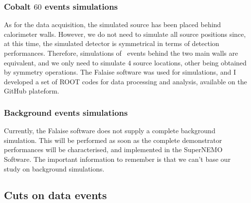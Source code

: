 \subsubsection*{Cobalt $60$ events simulations}
As for the data acquisition, the simulated source has been placed behind calorimeter walls.
However, we do not need to simulate all source positions since, at this time, the simulated detector is symmetrical in terms of detection performances.
Therefore, simulations of \Co\ events behind the two main walls are equivalent, and we only need to simulate $4$ source locations, other being obtained by symmetry operations.
The Falaise software was used for simulations, and I developed a set of ROOT codes for data processing and analysis, available on the GitHub plateform.


\subsubsection*{Background events simulations}

Currently, the Falaise software does not supply a complete background simulation.
This will be performed as soon as the complete demonstrator performances will be characterised, and implemented in the SuperNEMO Software.
The important information to remember is that we can't base our study on background simulations.


\subsection{Cuts on data events}

